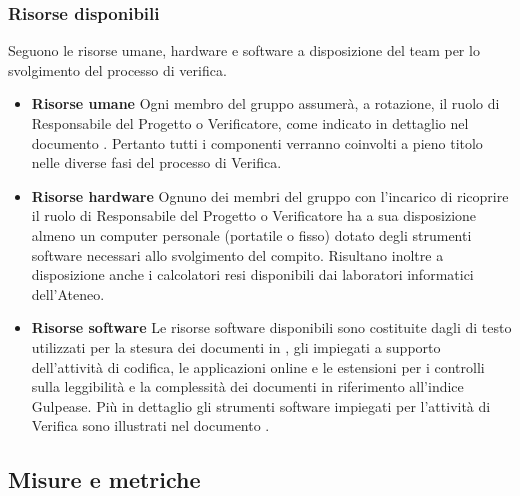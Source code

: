 		\subsubsection{Risorse disponibili}
		Seguono le risorse umane, hardware e software a disposizione del team per lo svolgimento del processo di verifica.
		\begin{itemize}
			\item \textbf{Risorse umane}
			Ogni membro del gruppo assumerà, a rotazione, il ruolo di Responsabile del Progetto o Verificatore, come indicato in dettaglio nel documento \PdP. Pertanto tutti i componenti verranno coinvolti a pieno titolo nelle diverse fasi del processo di Verifica.
			\item \textbf{Risorse hardware}
			Ognuno dei membri del gruppo con l'incarico di ricoprire il ruolo di Responsabile del Progetto o Verificatore ha a sua disposizione almeno un computer personale (portatile o fisso) dotato degli strumenti software necessari allo svolgimento del compito. Risultano inoltre a disposizione anche i calcolatori resi disponibili dai laboratori informatici dell'Ateneo.
			\item \textbf{Risorse software}
			Le risorse software disponibili sono costituite dagli  di testo utilizzati per la stesura dei documenti in , gli  impiegati a supporto dell'attività di codifica, le applicazioni online e le estensioni per i controlli sulla leggibilità e la complessità dei documenti in riferimento all'indice Gulpease. Più in dettaglio gli strumenti software impiegati per l'attività di Verifica sono illustrati nel documento \NdP.
			\end{itemize}
	\subsection{Misure e metriche \label{S5}}
